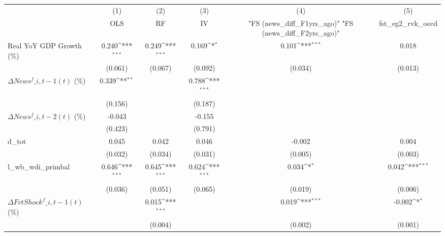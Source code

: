 {
\def\sym#1{\ifmmode^{#1}\else\(^{#1}\)\fi}
\begin{tabular}{l*{5}{c}}
\toprule
                    &\multicolumn{1}{c}{(1)}&\multicolumn{1}{c}{(2)}&\multicolumn{1}{c}{(3)}&\multicolumn{1}{c}{(4)}&\multicolumn{1}{c}{(5)}\\
                    &\multicolumn{1}{c}{OLS}&\multicolumn{1}{c}{RF}&\multicolumn{1}{c}{IV}&\multicolumn{1}{c}{ "FS (news\_diff\_F1yrs\_ago)"  "FS (news\_diff\_F2yrs\_ago)" }&\multicolumn{1}{c}{fst\_eg2\_rvk\_oecd}\\
\midrule
Real YoY GDP Growth (\%)&       0.240\sym{***}&       0.249\sym{***}&       0.169\sym{*}  &       0.101\sym{***}&       0.018         \\
                    &     (0.061)         &     (0.067)         &     (0.092)         &     (0.034)         &     (0.013)         \\
\addlinespace
$ \Delta News^f\_{i,t-1}(t)$ (\%)&       0.339\sym{**} &                     &       0.788\sym{***}&                     &                     \\
                    &     (0.156)         &                     &     (0.187)         &                     &                     \\
\addlinespace
$ \Delta News^f\_{i,t-2}(t)$ (\%)&      -0.043         &                     &      -0.155         &                     &                     \\
                    &     (0.423)         &                     &     (0.791)         &                     &                     \\
\addlinespace
d\_tot               &       0.045         &       0.042         &       0.046         &      -0.002         &       0.004         \\
                    &     (0.032)         &     (0.034)         &     (0.031)         &     (0.005)         &     (0.003)         \\
\addlinespace
l\_wb\_wdi\_primbal    &       0.646\sym{***}&       0.645\sym{***}&       0.624\sym{***}&       0.034\sym{*}  &       0.042\sym{***}\\
                    &     (0.036)         &     (0.051)         &     (0.065)         &     (0.019)         &     (0.006)         \\
\addlinespace
$ \Delta FctShock^f\_{i,t-1}(t)$ (\%)&                     &       0.015\sym{***}&                     &       0.019\sym{***}&      -0.002\sym{*}  \\
                    &                     &     (0.004)         &                     &     (0.002)         &     (0.001)         \\

\end{tabular}}
